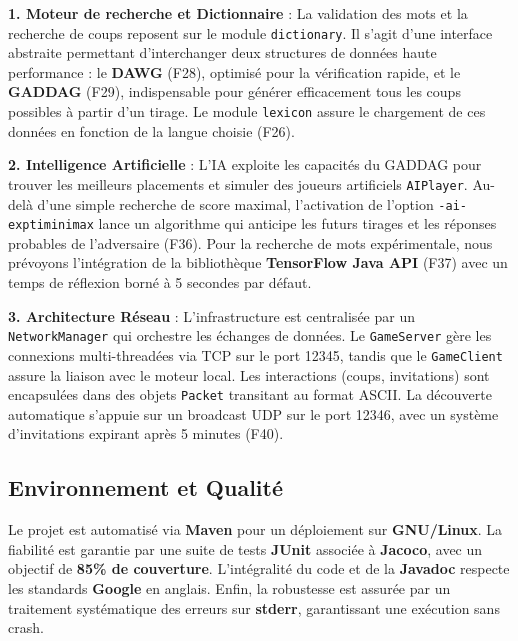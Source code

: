 \documentclass[a4paper]{article}
\begin{document}
\hangindent=1.5cm
\textbf{1. Moteur de recherche et Dictionnaire} : La validation des mots et la recherche de coups reposent sur le module \texttt{dictionary}. Il s'agit d'une interface abstraite permettant d'interchanger deux structures de données haute performance : le \textbf{DAWG} (F28), optimisé pour la vérification rapide, et le \textbf{GADDAG} (F29), indispensable pour générer efficacement tous les coups possibles à partir d'un tirage. Le module \texttt{lexicon} assure le chargement de ces données en fonction de la langue choisie (F26).

\vspace{1\baselineskip}
\hangindent=1.5cm
\textbf{2. Intelligence Artificielle} : L'IA exploite les capacités du GADDAG pour trouver les meilleurs placements et simuler des joueurs artificiels \texttt{AIPlayer}. Au-delà d'une simple recherche de score maximal, l'activation de l'option \texttt{-ai-exptiminimax} lance un algorithme qui anticipe les futurs tirages et les réponses probables de l'adversaire (F36). Pour la recherche de mots expérimentale, nous prévoyons l'intégration de la bibliothèque \textbf{TensorFlow Java API} (F37) avec un temps de réflexion borné à 5 secondes par défaut.

\vspace{1\baselineskip}
\hangindent=1.5cm
\textbf{3. Architecture Réseau} : L'infrastructure est centralisée par un \texttt{NetworkManager} qui orchestre les échanges de données. Le \texttt{GameServer} gère les connexions multi-threadées via TCP sur le port 12345, tandis que le \texttt{GameClient} assure la liaison avec le moteur local. Les interactions (coups, invitations) sont encapsulées dans des objets \texttt{Packet} transitant au format ASCII. La découverte automatique s'appuie sur un broadcast UDP sur le port 12346, avec un système d'invitations expirant après 5 minutes (F40).

\subsection{Environnement et Qualité}
\hangindent=0.8mm
Le projet est automatisé via \textbf{Maven} pour un déploiement sur \textbf{GNU/Linux}. La fiabilité est garantie par une suite de tests \textbf{JUnit} associée à \textbf{Jacoco}, avec un objectif de \textbf{85\% de couverture}. L'intégralité du code et de la \textbf{Javadoc} respecte les standards \textbf{Google} en anglais. Enfin, la robustesse est assurée par un traitement systématique des erreurs sur \textbf{stderr}, garantissant une exécution sans crash.


\nocite{*}



\appendix
\end{document}
